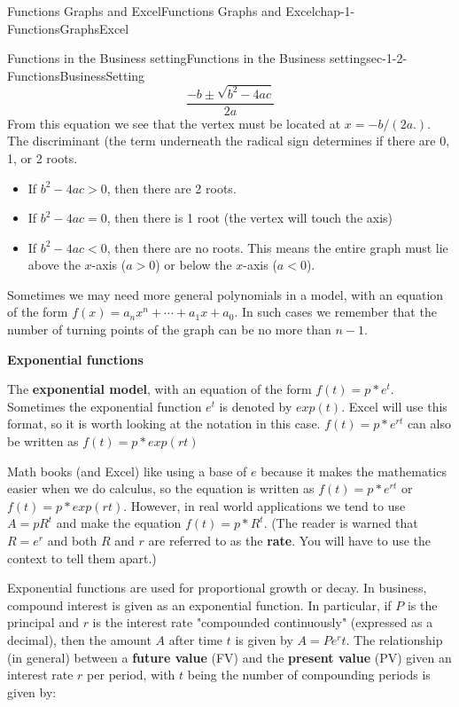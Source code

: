 \documentclass[oneside,10pt,]{book}
\newcommand{\terminology}[1]{\textbf{#1}}
\numberwithin{equation}{section}
\newcommand{\lt}{<}
\begin{document}
\begin{chapterptx}{Functions Graphs and Excel}{}{Functions Graphs and Excel}{}{}{chap-1-FunctionsGraphsExcel}
\begin{sectionptx}{Functions in the Business setting}{}{Functions in the Business setting}{}{}{sec-1-2-FunctionsBusinessSetting}
\begin{equation*}
\frac{-b\pm\sqrt{b^2-4ac}}{2a}
\end{equation*}
From this equation we see that the vertex must be located at \(x= -b/(2a.)\). The discriminant (the term underneath the radical sign determines if there are 0, 1, or 2 roots.%
\leavevmode%
\begin{itemize}[label=\textbullet]
\item{}\hypertarget{p-142}{}%
If \(b^2-4ac>0\), then there are 2 roots.%
\item{}\hypertarget{p-143}{}%
If \(b^2-4ac=0\), then there is 1 root (the vertex will touch the axis)%
\item{}\hypertarget{p-144}{}%
If \(b^2-4ac\lt 0\), then there are no roots. This means the entire graph must lie above the \(x\)-axis (\(a > 0\)) or below the \(x\)-axis (\(a \lt 0\)).%
\end{itemize}
\hypertarget{p-145}{}%
Sometimes we may need more general polynomials in a model, with an equation of the form \(f(x)=a_n x^n+\cdots+a_1 x+a_0\).  In such cases we remember that the number of turning points of the graph can be no more than \(n-1\).%
\par
\hypertarget{p-146}{}%
\terminology{Exponential functions}%
\par
\hypertarget{p-147}{}%
The \terminology{exponential model}, with an equation of the form \(f(t)=p*e^t\). Sometimes the exponential function \(e^t\) is denoted by \(exp(t)\). Excel will use this format, so it is worth looking at the notation in this case. \(f(t)=p*e^{rt}\) can also be written as  \(f(t)=p*exp(r t)\)%
\par
\hypertarget{p-148}{}%
Math books (and Excel) like using a base of \(e\) because it makes the mathematics easier when we do calculus, so the equation is written as \(f(t)=p*e^{rt}\) or \(f(t)=p*exp(r t)\). However, in real world applications we tend to use \(A=pR^t\) and make the equation \(f(t)=p*R^t\).  (The reader is warned that \(R=e^r\) and both \(R\) and \(r\) are referred to as the \terminology{rate}.  You will have to use the context to tell them apart.)%
\par
\hypertarget{p-149}{}%
Exponential functions are used for proportional growth or decay.  In business, compound interest is given as an exponential function. In particular, if \(P\) is the principal and \(r\) is the interest rate "compounded continuously" (expressed as a decimal), then the amount \(A\) after time \(t\) is given by \(A=P e^rt\). The relationship (in general) between a \terminology{future value} (FV) and the \terminology{present value} (PV) given an interest rate \(r\) per period, with \(t\) being the number of compounding periods is given by:%

\end{sectionptx}
\end{chapterptx}
\end{document}
